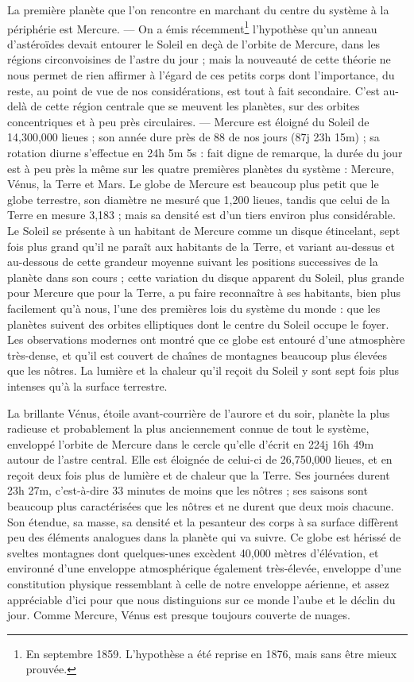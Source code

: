 \documentclass[a4paper, 11pt, oneside, landscape]{article}
\begin{document}
La première planète que l'on rencontre en marchant du centre du système à la périphérie est Mercure. --- On a émis récemment\footnote{En septembre 1859. L'hypothèse a été reprise en 1876, mais sans être mieux prouvée.} l'hypothèse qu'un anneau d'astéroïdes devait entourer le Soleil en deçà de l'orbite de Mercure, dans les régions circonvoisines de l'astre du jour ; mais la nouveauté de cette théorie ne nous permet de rien affirmer à l'égard de ces petits corps dont l'importance, du reste, au point de vue de nos considérations, est tout à fait secondaire. C'est au-delà de cette région centrale que se meuvent les planètes, sur des orbites concentriques et à peu près circulaires. --- Mercure est éloigné du Soleil de 14,300,000 lieues ; son année dure près de 88 de nos jours (87j 23h 15m) ; sa rotation diurne s'effectue en 24h 5m 5s : fait digne de remarque, la durée du jour est à peu près la même sur les quatre premières planètes du système : Mercure, Vénus, la Terre et Mars. Le globe de Mercure est beaucoup plus petit que le globe terrestre, son diamètre ne mesuré que 1,200 lieues, tandis que celui de la Terre en mesure 3,183 ; mais sa densité est d'un tiers environ plus considérable. Le Soleil se présente à un habitant de Mercure comme un disque étincelant, sept fois plus grand qu'il ne paraît aux habitants de la Terre, et variant au-dessus et au-dessous de cette grandeur moyenne suivant les positions successives de la planète dans son cours ; cette variation du disque apparent du Soleil, plus grande pour Mercure que pour la Terre, a pu faire reconnaître à ses habitants, bien plus facilement qu'à nous, l'une des premières lois du système du monde : que les planètes suivent des orbites elliptiques dont le centre du Soleil occupe le foyer. Les observations modernes ont montré que ce globe est entouré d'une atmosphère très-dense, et qu'il est couvert de chaînes de montagnes beaucoup plus élevées que les nôtres. La lumière et la chaleur qu'il reçoit du Soleil y sont sept fois plus intenses qu'à la surface terrestre.

La brillante Vénus, étoile avant-courrière de l'aurore et du soir, planète la plus radieuse et probablement la plus anciennement connue de tout le système, enveloppé l'orbite de Mercure dans le cercle qu'elle d'écrit en 224j 16h 49m autour de l'astre central. Elle est éloignée de celui-ci de 26,750,000 lieues, et en reçoit deux fois plus de lumière et de chaleur que la Terre. Ses journées durent 23h 27m, c'est-à-dire 33 minutes de moins que les nôtres ; ses saisons sont beaucoup plus caractérisées que les nôtres et ne durent que deux mois chacune. Son étendue, sa masse, sa densité et la pesanteur des corps à sa surface diffèrent peu des éléments analogues dans la planète qui va suivre. Ce globe est hérissé de sveltes montagnes dont quelques-unes excèdent 40,000 mètres d'élévation, et environné d'une enveloppe atmosphérique également très-élevée, enveloppe d'une constitution physique ressemblant à celle de notre enveloppe aérienne, et assez appréciable d'ici pour que nous distinguions sur ce monde l'aube et le déclin du jour. Comme Mercure, Vénus est presque toujours couverte de nuages.
\end{document}
